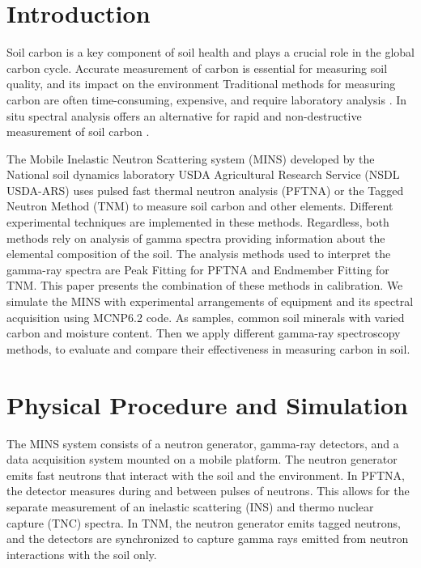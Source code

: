 \documentclass[preprint, 12pt]{elsarticle}
\begin{document}
\section{Introduction}

Soil carbon is a key component of soil health and plays a crucial role in the global carbon cycle. Accurate measurement of carbon is essential for measuring soil quality, and its impact on the environment \cite{lal_soil_2018} Traditional methods for measuring carbon are often time-consuming, expensive, and require laboratory analysis \cite{de_ros_advancing_2025}. In situ spectral analysis offers an alternative for rapid and non-destructive measurement of soil carbon \cite{yakubova_tagged_2019}.

The Mobile Inelastic Neutron Scattering system (MINS) developed by the National soil dynamics laboratory USDA Agricultural Research Service (NSDL USDA-ARS) uses pulsed fast thermal neutron analysis (PFTNA) \cite{yakubova_measuring_2025} or the Tagged Neutron Method (TNM) \cite{yakubova_tagged_2019} to measure soil carbon and other elements. Different experimental techniques are implemented in these methods. Regardless, both methods rely on analysis of gamma spectra providing information about the elemental composition of the soil. The analysis methods used to interpret the gamma-ray spectra are Peak Fitting for PFTNA and Endmember Fitting for TNM. This paper presents the combination of these methods in calibration. We simulate the MINS with experimental arrangements of equipment and its spectral acquisition using MCNP6.2 code. As samples, common soil minerals with varied carbon and moisture content. Then we apply different gamma-ray spectroscopy methods, to evaluate and compare their effectiveness in measuring carbon in soil.

\section{Physical Procedure and Simulation}

The MINS system consists of a neutron generator, gamma-ray detectors, and a data acquisition system mounted on a mobile platform. The neutron generator emits fast neutrons that interact with the soil and the environment. In PFTNA, the detector measures during and between pulses of neutrons. This allows for the separate measurement of an inelastic scattering (INS) and thermo nuclear capture (TNC) spectra. In TNM, the neutron generator emits tagged neutrons, and the detectors are synchronized to capture gamma rays emitted from neutron interactions with the soil only.
\end{document}
